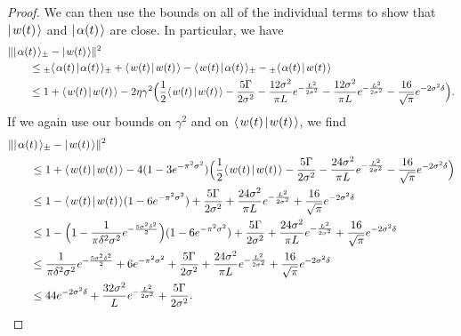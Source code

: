 \documentclass[../thesis-main/thesis-main]{subfiles}
\begin{document}
\begin{proof}
We can then use the bounds on all of the individual terms to show that $|\mspace{2mu} w(t) \mspace{2mu} \rangle$ and $|\mspace{2mu} \alpha(t) \mspace{2mu} \rangle$ are close.  In particular, we have 
\begin{align}   
  &\|{|\mspace{2mu} \alpha(t) \mspace{2mu} \rangle_{\pm} - |\mspace{2mu} w(t) \mspace{2mu} \rangle}\|^2\nonumber\\
    &\qquad\leq {}_{\pm}\langle\mspace{2mu} \alpha(t) \mspace{2mu} | \mspace{2mu} \alpha(t)\mspace{2mu} \rangle_{\pm} + \langle\mspace{2mu} w(t) \mspace{2mu} | \mspace{2mu} w(t)\mspace{2mu} \rangle - \langle\mspace{2mu} w(t) \mspace{2mu} | \mspace{2mu} \alpha(t)\mspace{2mu} \rangle_{\pm} - {}_\pm \langle\mspace{2mu} \alpha(t) \mspace{2mu} | \mspace{2mu} w(t)\mspace{2mu} \rangle\\
    &\qquad \leq 1 + \langle\mspace{2mu} w(t) \mspace{2mu} | \mspace{2mu} w(t)\mspace{2mu} \rangle - 2 \eta\gamma^2 \Big(\frac{1}{2} \langle\mspace{2mu} w(t) \mspace{2mu} | \mspace{2mu} w(t)\mspace{2mu} \rangle - \frac{5 \Gamma}{2\sigma^2}- \frac{12 \sigma^2}{\pi L} e^{ -\frac{L^2}{2\sigma^2}} - \frac{12 \sigma^2}{\pi L} e^{ - \frac{L^2}{2\sigma^2}} -  \frac{16}{\sqrt{\pi}} e^{-2\sigma^2 \delta}\Big).
\end{align}
If we again use our bounds on $\gamma^2$ and on $\langle\mspace{2mu} w(t) \mspace{2mu} | \mspace{2mu} w(t)\mspace{2mu} \rangle$, we find
\begin{align}
    &\|{|\mspace{2mu} \alpha(t) \mspace{2mu} \rangle_{\pm} - |\mspace{2mu} w(t) \mspace{2mu} \rangle}\|^2\nonumber\\
    & \qquad \leq 1 + \langle\mspace{2mu} w(t) \mspace{2mu} | \mspace{2mu} w(t)\mspace{2mu} \rangle - 4 (1 - 3 e^{-\pi^2 \sigma^2})\Big(\frac{1}{2} \langle\mspace{2mu} w(t) \mspace{2mu} | \mspace{2mu} w(t)\mspace{2mu} \rangle - \frac{5 \Gamma}{2\sigma^2}- \frac{24 \sigma^2}{\pi L} e^{ - \frac{L^2}{2\sigma^2}} -  \frac{16}{\sqrt{\pi}} e^{-2\sigma^2 \delta}\Big)\\
    & \qquad \leq 1 - \langle\mspace{2mu} w(t) \mspace{2mu} | \mspace{2mu} w(t)\mspace{2mu} \rangle ( 1 - 6 e^{-\pi^2 \sigma^2}) + \frac{5 \Gamma}{2\sigma^2}+ \frac{24 \sigma^2}{\pi L} e^{ - \frac{L^2}{2\sigma^2}} +  \frac{16}{\sqrt{\pi}} e^{-2\sigma^2 \delta}\\
    & \qquad \leq 1 - \Big(1 - \frac{1}{\pi \delta^2 \sigma^2} e^{- \frac{5 \sigma^2 \delta^2}{2}} \Big)( 1 - 6 e^{-\pi^2 \sigma^2}) + \frac{5 \Gamma}{2\sigma^2}+ \frac{24 \sigma^2}{\pi L} e^{ - \frac{L^2}{2\sigma^2}} +  \frac{16}{\sqrt{\pi}} e^{-2\sigma^2 \delta}\\
    & \qquad \leq \frac{1}{\pi \delta^2 \sigma^2}e^{- \frac{5 \sigma^2 \delta^2}{2}}  + 6 e^{-\pi^2 \sigma^2} +\frac{5 \Gamma}{2\sigma^2}+ \frac{24 \sigma^2}{\pi L} e^{ - \frac{L^2}{2\sigma^2}} +  \frac{16}{\sqrt{\pi}} e^{-2\sigma^2 \delta}\\
    & \qquad \leq 44e^{-2\sigma^2 \delta} + \frac{32\sigma^2}{L} e^{- \frac{L^2}{2\sigma^2}} + \frac{5 \Gamma}{2\sigma^2}.
\end{align}


\end{proof}
\end{document}
